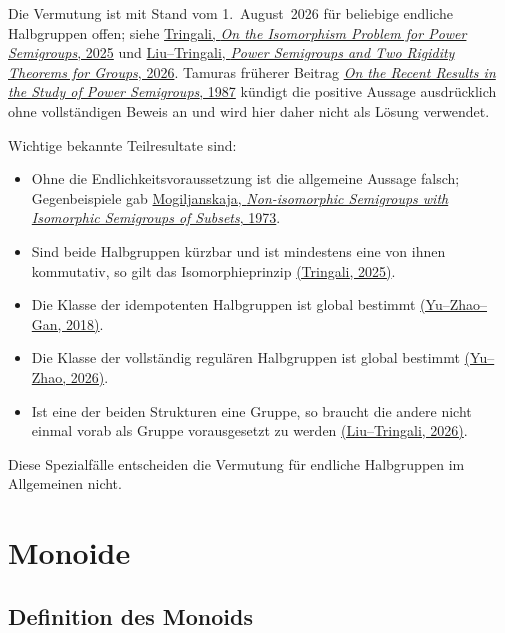 \documentclass[main.tex]{subfiles}
\begin{document}
\begin{remark}
Die Vermutung ist mit Stand vom 1.~August~2026 für beliebige endliche
Halbgruppen offen; siehe
\href{https://doi.org/10.1007/978-3-031-75326-8_20}%
  {Tringali, \emph{On the Isomorphism Problem for Power Semigroups}, 2025}
und
\href{https://doi.org/10.48550/arXiv.2606.01917}%
  {Liu--Tringali, \emph{Power Semigroups and Two Rigidity Theorems for
  Groups}, 2026}.
Tamuras früherer Beitrag
\href{https://doi.org/10.1007/978-94-009-3839-7_22}%
  {\emph{On the Recent Results in the Study of Power Semigroups}, 1987}
kündigt die positive Aussage ausdrücklich ohne vollständigen Beweis an und
wird hier daher nicht als Lösung verwendet.

Wichtige bekannte Teilresultate sind:
\begin{itemize}
  \item Ohne die Endlichkeitsvoraussetzung ist die allgemeine Aussage falsch;
    Gegenbeispiele gab
    \href{https://doi.org/10.1007/BF02389140}%
      {Mogiljanskaja, \emph{Non-isomorphic Semigroups with Isomorphic
      Semigroups of Subsets}, 1973}.
  \item Sind beide Halbgruppen kürzbar und ist mindestens eine von ihnen
    kommutativ, so gilt das Isomorphieprinzip
    \href{https://doi.org/10.1007/978-3-031-75326-8_20}%
      {(Tringali, 2025)}.
  \item Die Klasse der idempotenten Halbgruppen ist global bestimmt
    \href{https://doi.org/10.1080/00927872.2017.1319474}%
      {(Yu--Zhao--Gan, 2018)}.
  \item Die Klasse der vollständig regulären Halbgruppen ist global bestimmt
    \href{https://doi.org/10.1080/00927872.2026.2659846}%
      {(Yu--Zhao, 2026)}.
  \item Ist eine der beiden Strukturen eine Gruppe, so braucht die andere
    nicht einmal vorab als Gruppe vorausgesetzt zu werden
    \href{https://doi.org/10.48550/arXiv.2606.01917}%
      {(Liu--Tringali, 2026)}.
\end{itemize}
Diese Spezialfälle entscheiden die Vermutung für endliche Halbgruppen im
Allgemeinen nicht.
\end{remark}

\chapter{Monoide}

\section{Definition des Monoids}
\end{document}

